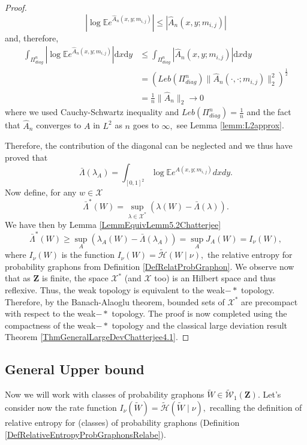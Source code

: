 \documentclass[12pt,twoside,a4paper]{article}
\newcommand{\SquareDiag}{{\Pi^n_{diag}}}
\newcommand{\Space}{\mathbf{Z}}
\newcommand{\UGraphon}{\widetilde{\mathcal{W}}_1}
\newcommand{\EE}{\mathbb{E}}
\begin{document}
\begin{proof}
\[
|\log\EE e^{\widehat{A}_n(x,y;m_{i,j})}|\leq |\widehat{A}_n(x,y;m_{i,j})|
\]
and, therefore,
\[
\begin{aligned}
\int_{\SquareDiag}|\log\EE e^{\widehat{A}_n(x,y;m_{i,j})}|\mathrm{d}x\mathrm{d}y & \leq \int_{\SquareDiag}|\widehat{A}_n(x,y;m_{i,j})|\mathrm{d}x\mathrm{d}y\\ &=\left(Leb(\SquareDiag)\|\widehat{A}_n(\cdot,\cdot;m_{i,j})\|^2_2 \right)^{\frac{1}{2}}\\&
=\frac{1}{n}\|\widehat{A}_n\|_2 \rightarrow 0
\end{aligned}\]
where we used Cauchy-Schwartz inequality and $Leb(\SquareDiag)=\tfrac{1}{n}$ and the fact that $\widehat{A}_n$ converges to $A$ in $L^2$ as $n$ goes to $\infty,$ see Lemma \ref{lemm:L2approx}.

Therefore, the contribution of the diagonal can be neglected and we thus have proved that 
\[
\bar{\Lambda}(\lambda_A)=\int_{[0,1]^2}\log\EE e^{A(x,y;m_{i,j})}dxdy.
\] Now define, for any $w\in\mathcal{X}$
\[
\bar{\Lambda}^*(W)=\sup_{\lambda\in \mathcal{X}^*} (\lambda(W)-\bar{\Lambda}(\lambda)).
\]
We have then by Lemma \ref{LemmEquivLemm5.2Chatterjee}
\[
\bar{\Lambda}^*(W)\geq \sup_A (\lambda_A(W)-\bar{\Lambda}(\lambda_A))=\sup_A J_A(W)=I_{\nu}(W),
\]
where $I_{\nu}(W)$ is the function $I_{\nu}(W)=\widetilde{\mathcal{H}}(W \mid \nu),$  the relative entropy for probability graphons from Definition \ref{DefRelatProbGraphon}.
We observe now that as $\Space$ is finite, the space $\mathcal{X}^*$ (and $\mathcal{X}$ too) is an Hilbert space and thus reflexive. Thus, the weak topology is equivalent to the weak$-*$ topology. Therefore, by the Banach-Alaoglu theorem, bounded sets of $\mathcal{X}^*$ are precompact with respect to the weak$-*$ topology. 
The proof is now completed using the compactness of the weak$-*$ topology and the classical large deviation result Theorem \ref{ThmGeneralLargeDevChatterjee4.1}.
\end{proof}

\subsection{General Upper bound}
Now we will work with classes of probability graphons $\widetilde{W}\in \UGraphon(\Space).$
Let's consider now the rate function $I_{\nu}(\widetilde{W})=\widetilde{\mathcal{H}}(\widetilde{W} \mid \nu),$ recalling the definition of relative entropy for (classes) of probability graphons (Definition \ref{DefRelativeEntropyProbGraphonsRelabe}).
\end{document}
